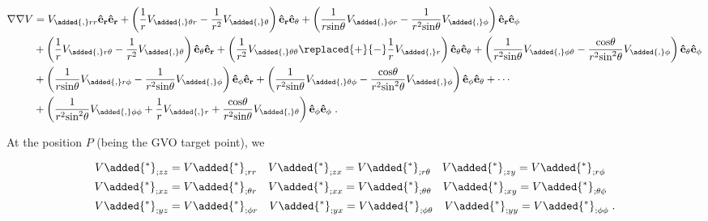\documentclass[extra,mreferee]{gji}
\begin{document}
\begin{align}
\nabla \nabla V &= V_{\added{,}rr} \mathbf{\hat{e}_r} \mathbf{\hat{e}_r} + \left(\frac{1}{r}  V_{\added{,}\theta r} - \frac{1}{r^2} V_{\added{,}\theta} \right) \mathbf{\hat{e}_r} \mathbf{\hat{e}_{\theta}}
+ \left( \frac{1}{r \mathrm{sin}\theta} V_{\added{,}\phi r} - \frac{1}{r^2 \mathrm{sin}\theta} V_{\added{,}\phi} \right) \mathbf{\hat{e}_r} \mathbf{\hat{e}_{\phi}} \nonumber \\
                &+ \left( \frac{1}{r} V_{\added{,}r \theta} - \frac{1}{r^2} V_{\added{,}\theta} \right) \mathbf{\hat{e}_{\theta}} \mathbf{\hat{e}_r} + \left( \frac{1}{r^2} V_{\added{,}\theta \theta} \replaced{+}{-} \frac{1}{r} V_{\added{,}r} \right) \mathbf{\hat{e}_{\theta}} \mathbf{\hat{e}_{\theta}} + \left( \frac{1}{r^2 \mathrm{sin}\theta} V_{\added{,}\phi \theta} - \frac{\mathrm{cos}\theta}{r^2 \mathrm{sin}^2\theta} V_{\added{,}\phi} \right) \mathbf{\hat{e}_{\theta}} \mathbf{\hat{e}_{\phi}}  \nonumber \\
                &+\left( \frac{1}{r \mathrm{sin}\theta} V_{\added{,}r \phi} - \frac{1}{r^2 \mathrm{sin}\theta} V_{\added{,}\phi} \right) \mathbf{\hat{e}_{\phi}} \mathbf{\hat{e}_r} + \left( \frac{1}{r^2 \mathrm{sin}\theta} V_{\added{,} \theta \phi} - \frac{\mathrm{cos}\theta}{r^2 \mathrm{sin}^2\theta} V_{\added{,}\phi} \right) \mathbf{\hat{e}_{\phi}} \mathbf{\hat{e}_{\theta}} + \cdots  \nonumber \\
                & + \left( \frac{1}{r^2 \mathrm{sin}^2\theta} V_{\added{,} \phi \phi} + \frac{1}{r} V_{\added{,}r} +  \frac{\mathrm{cos}\theta}{r^2 \mathrm{sin}\theta} V_{\added{,}\theta} \right) \mathbf{\hat{e}_{\phi}} \mathbf{\hat{e}_{\phi}} \; . \label{eq:second_order_pot}
\end{align}

At the position $P$ (being the GVO target point), we  

\begin{align}
V\added{^*}_{;zz}&=V\added{^*}_{;rr} \quad V\added{^*}_{;zx}=V\added{^*}_{;r \theta} \quad V\added{^*}_{;zy}=V\added{^*}_{;r \phi} \\
V\added{^*}_{;xz}&=V\added{^*}_{;\theta r} \quad V\added{^*}_{;xx}=V\added{^*}_{;\theta \theta} \quad V\added{^*}_{;xy}=V\added{^*}_{;\theta \phi} \\
V\added{^*}_{;yz}&=V\added{^*}_{;\phi r} \quad V\added{^*}_{;yx}=V\added{^*}_{;\phi \theta} \quad V\added{^*}_{;yy}=V\added{^*}_{;\phi \phi} \; .
\end{align}
\end{document}
